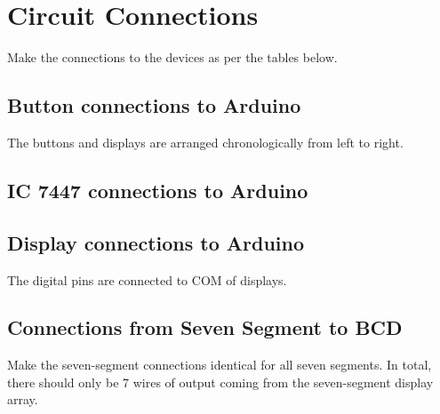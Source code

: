 \section{Circuit Connections}
\raggedright
Make the connections to the devices as per the tables below.
\begin{centering}
\subsection{Button connections to Arduino}
\end{centering}
\raggedright
The buttons and displays are arranged chronologically from left to right.\\
\vspace{0.25cm}


\subsection{IC 7447 connections to Arduino}
\raggedright
\vspace{0.25cm}


\subsection{Display connections to Arduino}
\raggedright
The digital pins are connected to COM of displays.\\
\vspace{0.25cm}


\subsection{Connections from Seven Segment to BCD}
\raggedright
Make the seven-segment connections identical for all seven segments. 
In total, there should only be 7 wires of output coming from the seven-segment display array.
\vspace{0.25cm}

